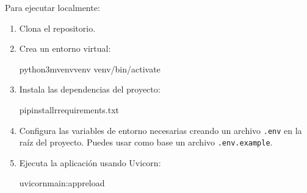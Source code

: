 \documentclass[a4paper,11pt,spanish]{sphinxmanual}
\newcommand{\robotoMonoBold}{\fontseries{b}\selectfont\ttfamily}
\renewcommand{\sphinxcode}[1]{\textcolor{sphinxorangeCode}{{\robotoMonoBold #1}}}
\renewcommand{\sphinxupquote}[1]{\texttt{#1}}
\begin{document}
\sphinxAtStartPar
Para ejecutar localmente:
\begin{enumerate}
%
\item {} 
\sphinxAtStartPar
Clona el repositorio.

\item {} 
\sphinxAtStartPar
Crea un entorno virtual:

\begin{sphinxVerbatim}[commandchars=\\\{\}]
python3\PYGZhy{}mvenvvenv
venv/bin/activate
\end{sphinxVerbatim}

\item {} 
\sphinxAtStartPar
Instala las dependencias del proyecto:

\begin{sphinxVerbatim}[commandchars=\\\{\}]
pipinstall\PYGZhy{}rrequirements.txt
\end{sphinxVerbatim}

\item {} 
\sphinxAtStartPar
Configura las variables de entorno necesarias creando un archivo \sphinxcode{\sphinxupquote{.env}} en la raíz del proyecto.
Puedes usar como base un archivo \sphinxcode{\sphinxupquote{.env.example}}.

\item {} 
\sphinxAtStartPar
Ejecuta la aplicación usando Uvicorn:

\begin{sphinxVerbatim}[commandchars=\\\{\}]
uvicornmain:app\PYGZhy{}\PYGZhy{}reload
\end{sphinxVerbatim}

\end{enumerate}
\end{document}
